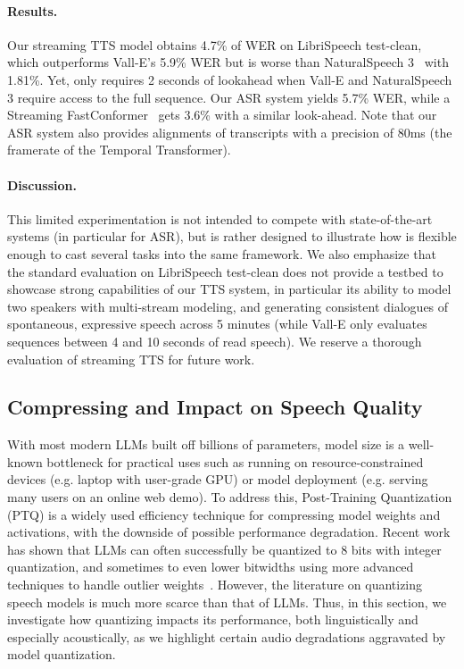 \paragraph{Results.} Our streaming TTS model obtains 4.7\% of WER on LibriSpeech test-clean, which outperforms Vall-E's 5.9\% WER but is worse than NaturalSpeech 3~\citep{ju2024naturalspeech} with 1.81\%. Yet, \ours{} only requires 2 seconds of lookahead when Vall-E and NaturalSpeech 3 require access to the full sequence. Our ASR system yields 5.7\% WER, while a Streaming FastConformer~\citep{noroozi2024stateful} gets 3.6\% with a similar look-ahead. Note that our ASR system also provides alignments of transcripts with a precision of 80ms (the framerate of the Temporal Transformer).

\paragraph{Discussion.} This limited experimentation is not intended to compete with state-of-the-art systems (in particular for ASR), but is rather designed to illustrate how \interleaving{} is flexible enough to cast several tasks into the same framework. We also emphasize that the standard evaluation on LibriSpeech test-clean does not provide a testbed to showcase strong capabilities of our TTS system, in particular its ability to model two speakers with multi-stream modeling, and generating consistent dialogues of spontaneous, expressive speech across 5 minutes (while Vall-E only evaluates sequences between 4 and 10 seconds of read speech). We reserve a thorough evaluation of streaming TTS for future work.











\subsection{Compressing \ours{} and Impact on Speech Quality}

With most modern LLMs built off billions of parameters, model size is a well-known bottleneck for practical uses such as running on resource-constrained devices (e.g. laptop with user-grade GPU) or model deployment (e.g. serving many users on an online web demo). 
To address this, Post-Training Quantization (PTQ) is a widely used efficiency technique for compressing model weights and activations,  with the downside of possible performance degradation. Recent work has shown that LLMs can often successfully be quantized to 8 bits with integer quantization, and sometimes to even lower bitwidths using more advanced techniques to handle outlier weights~\citep{pmlr-v202-dettmers23a, llmint8,optq,quipsharp}.
However, the literature on quantizing speech models is much more scarce than that of LLMs. 
Thus, in this section, we investigate how quantizing \ours{} impacts its performance, both linguistically and especially acoustically,  as we  highlight certain audio degradations aggravated by model quantization.
